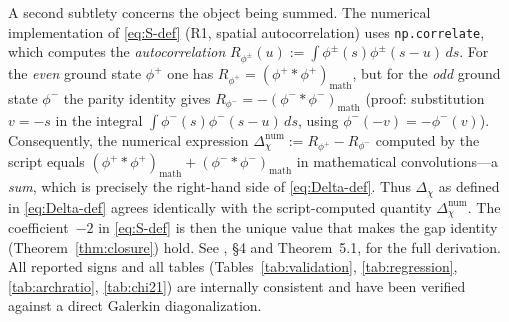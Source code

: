 \documentclass[10pt,twocolumn]{article}
\theoremstyle{definition}
\theoremstyle{remark}
\newcommand{\chifn}{\chi}
\newcommand{\Deltachi}{\Delta_{\chifn}}
\begin{document}
A second subtlety concerns the object being summed. The numerical
implementation of \eqref{eq:S-def} (R1, spatial autocorrelation)
uses \texttt{np.correlate}, which computes the \emph{autocorrelation}
$R_{\phi^\pm}(u):=\int\phi^\pm(s)\phi^\pm(s-u)\,ds$.
For the \emph{even} ground state $\phi^+$ one has
$R_{\phi^+}=(\phi^+{*}\phi^+)_{\mathrm{math}}$, but for the
\emph{odd} ground state $\phi^-$ the parity identity gives
$R_{\phi^-}=-(\phi^-{*}\phi^-)_{\mathrm{math}}$ (proof: substitution
$v=-s$ in the integral $\int\phi^-(s)\phi^-(s-u)\,ds$, using
$\phi^-(-v)=-\phi^-(v)$). Consequently, the numerical expression
$\Deltachi^{\mathrm{num}}:=R_{\phi^+}-R_{\phi^-}$ computed by the
script equals
$(\phi^+{*}\phi^+)_{\mathrm{math}}+(\phi^-{*}\phi^-)_{\mathrm{math}}$
in mathematical convolutions---a \emph{sum}, which is precisely the
right-hand side of \eqref{eq:Delta-def}. Thus $\Deltachi$ as defined
in \eqref{eq:Delta-def} agrees identically with the script-computed
quantity $\Deltachi^{\mathrm{num}}$. The coefficient~$-2$ in
\eqref{eq:S-def} is then the unique value that makes the gap
identity (Theorem~\ref{thm:closure}) hold. See
\cite{AnalyticKernelV2}, \S4 and Theorem~5.1, for the full
derivation. All reported signs and all tables
(Tables~\ref{tab:validation}, \ref{tab:regression},
\ref{tab:archratio}, \ref{tab:chi21}) are internally consistent
and have been verified against a direct Galerkin diagonalization.
\end{document}
